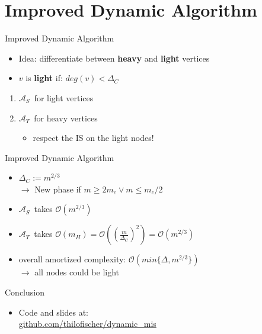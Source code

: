 \documentclass{beamer}
\newcommand{\trivial}{$\mathcal{A}_T$}
\newcommand{\simple}{$\mathcal{A}_S$}
\begin{document}
\section{Improved Dynamic Algorithm}
\begin{frame}{Improved Dynamic Algorithm}
  \begin{itemize}
    \item Idea: differentiate between \textbf{heavy} and \textbf{light} vertices
    \item $v$ is \textbf{light} if: $deg(v) < \Delta_C$
  \end{itemize}
  \begin{enumerate}
    \pause
    \bigskip
    \item \simple\ for light vertices
    \medskip
    \item \trivial\ for heavy vertices
    \begin{itemize}
      \item respect the IS on the light nodes!
    \end{itemize}
  \end{enumerate} 
\end{frame}

\begin{frame}{Improved Dynamic Algorithm}
  \begin{itemize}
    \item $\Delta_C := m^{2/3}$
    \\
    $\rightarrow$ New phase if $m \geq 2m_c \lor m \leq m_c/2$

    \bigskip
    \item \simple\ takes $\mathcal{O}(m^{2/3})$

    \item \trivial\ takes $\mathcal{O}(m_H) = \mathcal{O}((\frac{m}{\Delta_C})^2) = \mathcal{O}(m^{2/3})$

    \pause
    \bigskip
    \item overall amortized complexity: $\mathcal{O}(min\{\Delta, m^{2/3}\})$
    \\
    $\rightarrow$ all nodes could be light
  \end{itemize}
\end{frame}

\begin{frame}{Conclusion}
  \begin{itemize}
    \item Code and slides at: \\
          \href{https://www.github.com/thilofischer/dynamic_mis}{github.com/thilofischer/dynamic\_mis}
  \end{itemize}
\end{frame}
\end{document}
